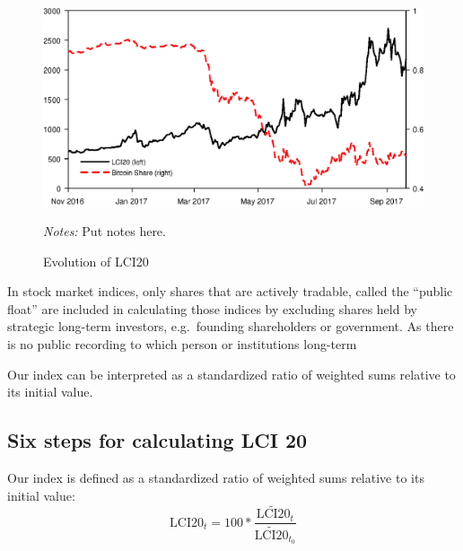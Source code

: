 \documentclass[11pt]{article}
\newcommand\fnotes[1]{\captionsetup{font=scriptsize}\caption*{\textsl{Notes:} #1}}
\begin{document}
\begin{figure}%
    \centering%
    \caption{Evolution of LCI20}\label{f:lci20}%
    \includegraphics[width=\textwidth]{figs/lci20.eps}%
    \fnotes{Put notes here.}
\end{figure}

In stock market indices, only shares that are actively tradable, called the ``public float'' are included in calculating those indices by excluding shares held by strategic long-term investors, e.g.\ founding shareholders or government.
As there is no public recording to which person or institutions long-term

Our index can be interpreted as a standardized ratio of weighted sums relative to its initial value.

\subsection{Six steps for calculating LCI 20}

Our index is defined as a standardized ratio of weighted sums relative to its initial value:
\begin{equation}
  \text{LCI20}_t = 100 * \frac{\widetilde{\text{LCI20}}_t}{\widetilde{\text{LCI20}}_{t_0}}
\end{equation}
\end{document}
